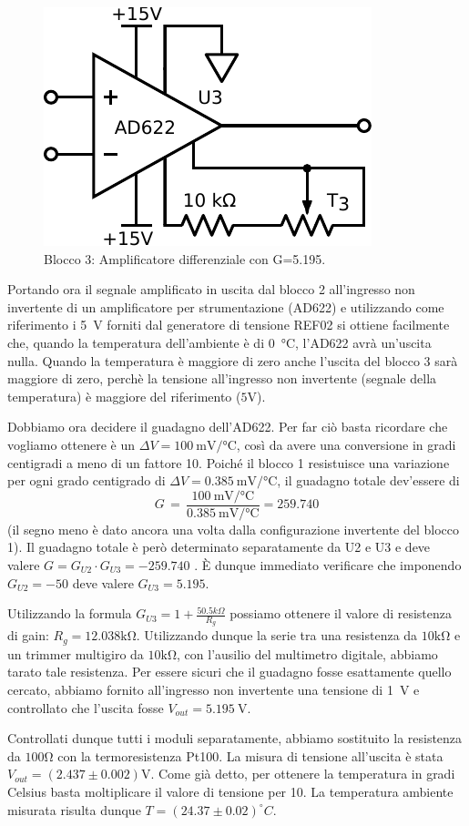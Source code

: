\begin{figure}
\centering
\includegraphics[width=.25\textwidth]{../E06/latex/P3.pdf}
\caption{Blocco 3: Amplificatore differenziale con G=5.195.}
\label{cir6:blocco3}
\end{figure}

Portando ora il segnale amplificato in uscita dal blocco 2 all'ingresso non invertente di un amplificatore per strumentazione (AD622) e utilizzando come riferimento i \SI{5}{\volt} forniti dal generatore di tensione REF02 si ottiene facilmente che, quando la temperatura dell'ambiente è di \SI{0}{\celsius}, l'AD622 avrà un'uscita nulla.
Quando la temperatura è maggiore di zero anche l'uscita del blocco 3 sarà maggiore di zero, perchè la tensione all'ingresso non invertente (segnale della temperatura) è maggiore del riferimento ($5\si{\volt}$).

Dobbiamo ora decidere il guadagno dell'AD622.
Per far ciò basta ricordare che vogliamo ottenere è un $\Delta V=\SI{100}{\milli\volt}/\si{\celsius}$, così da avere una conversione in gradi centigradi a meno di un fattore 10.
Poiché il blocco 1 resistuisce una variazione per ogni grado centigrado di $\Delta V=\SI{0.385}{\milli\volt}/\si{\celsius}$, il guadagno totale dev'essere di
$$G\,=\,\frac{\SI{100}{\milli\volt}/\si{\celsius}}{\SI{0.385}{\milli\volt}/\si{\celsius}}=\num{259.740}$$
(il segno meno è dato ancora una volta dalla configurazione invertente del blocco 1).
Il guadagno totale è però determinato separatamente da U2 e U3 e deve valere $G= G_{U2}\cdot G_{U3}=-259.740$ .
È dunque immediato verificare che imponendo $G_{U2}=-50$ deve valere $G_{U3}=5.195$.

Utilizzando la formula $G_{U3}=1+\frac{50.5k\Omega}{R_g}$ possiamo ottenere il valore di resistenza di gain: $R_g=12.038\si{\kilo\ohm}$.
Utilizzando dunque la serie tra una resistenza da $10\si{\kilo\ohm}$ e un trimmer multigiro da $10\si{\kilo\ohm}$, con l'ausilio del multimetro digitale, abbiamo tarato tale resistenza. 
Per essere sicuri che il guadagno fosse esattamente quello cercato, abbiamo fornito all'ingresso non invertente una tensione di \SI{1}{\volt} e controllato che l'uscita fosse $V_{out}=\SI{5.195}{\V}$. 

Controllati dunque tutti i moduli separatamente, abbiamo sostituito la resistenza da $100\si{\ohm}$ con la termoresistenza Pt100.
La misura di tensione all'uscita è stata $V_{out}=(2.437\pm 0.002)\si{\volt}$.
Come già detto, per ottenere la temperatura in gradi Celsius basta moltiplicare il valore di tensione per 10.
La temperatura ambiente misurata risulta dunque $T=(24.37\pm0.02)^{\circ}C$.

